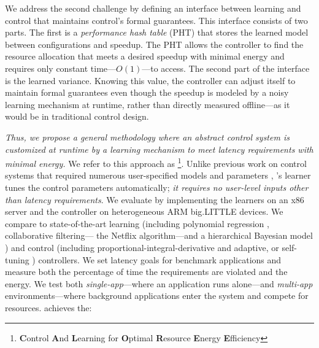 We address the second challenge by defining an interface between
learning and control that maintains control's formal guarantees.  This
interface consists of two parts.  The first is a \emph{performance
  hash table} (PHT) that stores the learned model between
configurations and speedup.  The PHT allows the controller to find the
resource allocation that meets a desired speedup with minimal energy
and requires only constant time---$O(1)$---to access.  The second part
of the interface is the learned variance.  Knowing this value, the
controller can adjust itself to maintain formal guarantees even though
the speedup is modeled by a noisy learning mechanism at runtime,
rather than directly measured offline---as it would be in traditional
control design.


\emph{Thus, we propose a general methodology where an abstract control
  system is customized at runtime by a learning mechanism to meet
  latency requirements with minimal energy.} We refer to this
approach as \SYSTEM{}\footnote{\textbf{C}ontrol \textbf{A}nd
  \textbf{L}earning for \textbf{O}ptimal \textbf{R}esource
  \textbf{E}nergy \textbf{E}fficiency}.  Unlike previous work on
control systems that required numerous user-specified models and
parameters \cite{METE,Chen2011,POET,ControlWare,Agilos}, \SYSTEM{}'s
learner tunes the control parameters automatically; \ie{} \emph{it
  requires no user-level inputs other than latency requirements}.
We evaluate \SYSTEM{} by implementing the learners on an x86 server
and the controller on heterogeneous ARM big.LITTLE devices.  We
compare to state-of-the-art learning (including polynomial regression
\cite{Koala,dubach2010}, collaborative filtering---\ie{} the Netflix
algorithm\cite{netflix,Paragon}---and a hierarchical Bayesian model
\cite{LEO}) and control (including proportional-integral-derivative
\cite{Hellerstein2004a} and adaptive, or self-tuning
\cite{HandbookControl}) controllers.  We set latency goals for
benchmark applications and measure both the percentage of time the
requirements are violated and the energy.  We test both
\emph{single-app}---where an application runs alone---and
\emph{multi-app} environments---where background applications enter
the system and compete for resources.  \SYSTEM{} achieves the:
